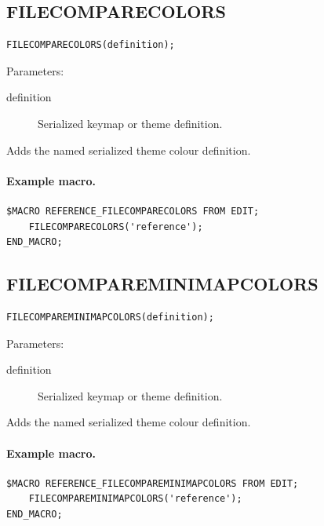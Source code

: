 \documentclass[a4paper,10pt,twoside,openany]{book}
\newenvironment{mrmacextension}{\begin{changebar}}{\end{changebar}}
\begin{document}
\begin{mrmacextension}
\label{prim:procedure-filecomparecolors}
\subsection*{FILECOMPARECOLORS}
\begin{verbatim}
FILECOMPARECOLORS(definition);
\end{verbatim}
Parameters:
\begin{description}
\item[definition] Serialized keymap or theme definition.
\end{description}

Adds the named serialized theme colour definition.

\paragraph{Example macro.}
\begin{verbatim}
$MACRO REFERENCE_FILECOMPARECOLORS FROM EDIT;
    FILECOMPARECOLORS('reference');
END_MACRO;
\end{verbatim}
\end{mrmacextension}

\begin{mrmacextension}
\label{prim:procedure-filecompareminimapcolors}
\subsection*{FILECOMPAREMINIMAPCOLORS}
\begin{verbatim}
FILECOMPAREMINIMAPCOLORS(definition);
\end{verbatim}
Parameters:
\begin{description}
\item[definition] Serialized keymap or theme definition.
\end{description}

Adds the named serialized theme colour definition.

\paragraph{Example macro.}
\begin{verbatim}
$MACRO REFERENCE_FILECOMPAREMINIMAPCOLORS FROM EDIT;
    FILECOMPAREMINIMAPCOLORS('reference');
END_MACRO;
\end{verbatim}
\end{mrmacextension}
\end{document}
